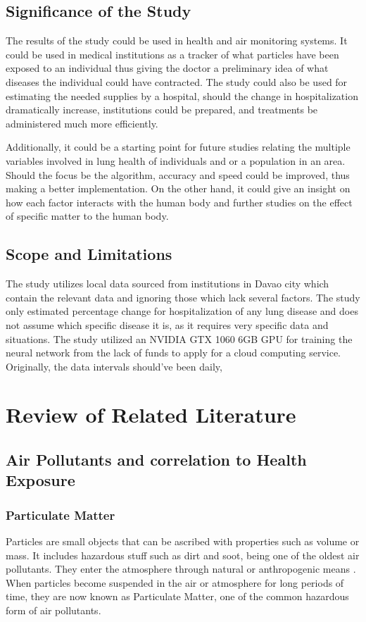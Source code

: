 \documentclass[10pt,11pt,12pt,oneside]{book}
\begin{document}
    \section{Significance of the Study}
    The results of the study could be used in health and air monitoring systems. It could be used in medical institutions as a tracker of what particles have been exposed to an individual thus giving the doctor a preliminary idea of what diseases the individual could have contracted. The study could also be used for estimating the needed supplies by a hospital, should the change in hospitalization dramatically increase, institutions could be prepared, and treatments be administered much more efficiently.
    
    Additionally, it could be a starting point for future studies relating the multiple variables involved in lung health of individuals and or a population in an area. Should the focus be the algorithm, accuracy and speed could be improved, thus making a better implementation. On the other hand, it could give an insight on how each factor interacts with the human body and further studies on the effect of specific matter to the human body.
    \section{Scope and Limitations}
    The study utilizes local data sourced from institutions in Davao city which contain the relevant data and ignoring those which lack several factors. The study only estimated percentage change for hospitalization of any lung disease and does not assume which specific disease it is, as it requires very specific data and situations. The study utilized an NVIDIA GTX 1060 6GB GPU for training the neural network from the lack of funds to apply for a cloud computing service.
    Originally, the data intervals should've been daily, 
\chapter{Review of Related Literature}
    \section{Air Pollutants and correlation to Health Exposure}
        \subsection{Particulate Matter}
        Particles are small objects that can be ascribed with properties such as volume or mass. It includes hazardous stuff such as dirt and soot, being one of the oldest air pollutants. They enter the atmosphere through natural or anthropogenic means \cite{knudsen2012particulate}. When particles become suspended in the air or atmosphere for long periods of time, they are now known as Particulate Matter, one of the common hazardous form of air pollutants. 
        
\end{document}
